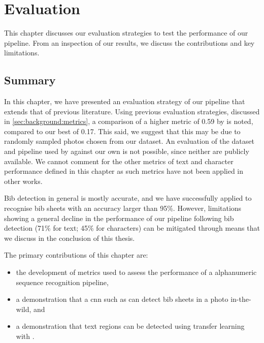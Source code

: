 \chapter{Evaluation}
\label{ch:evaluation}

This chapter discusses our evaluation strategies to test the performance of our pipeline. From an inspection of our results, we discuss the contributions and key limitations.



\clearpage

\clearpage

\section{Summary}

In this chapter, we have presented an evaluation strategy of our pipeline that extends that of previous literature. Using previous evaluation strategies, discussed in \cref{sec:background:metrics}, a comparison of a higher \fscore{} metric of 0.59 by \citet{Benami:2012jf} is noted, compared to our best of 0.17. This said, we suggest that this may be due to randomly sampled photos chosen from our dataset. An evaluation of the dataset and pipeline used by \citeauthor{Benami:2012jf} against our own is not possible, since neither are publicly available. We cannot comment for the other metrics of text and character performance defined in this chapter as such metrics have not been applied in other works. 

Bib detection in general is mostly accurate, and we have successfully applied \frcnn{} to recognise bib sheets with an accuracy larger than 95\%. However, limitations showing a general decline in the performance of our pipeline following bib detection (71\% for text; 45\% for characters) can be mitigated through means that we discuss in the conclusion of this thesis.

\bigskip

\noindent
The primary contributions of this chapter are:

\begin{itemize}
  \item the development of metrics used to assess the performance of a alphanumeric sequence recognition pipeline,
  \item a demonstration that a \gls{cnn} such as \frcnn{} can detect bib sheets in a photo in-the-wild, and
  \item a demonstration that text regions can be detected using transfer learning with \frcnn{}.
\end{itemize}

